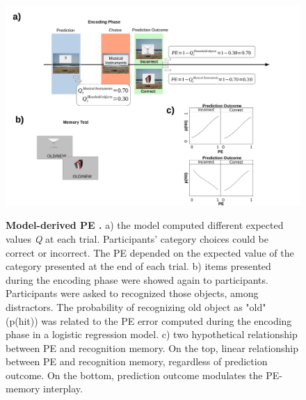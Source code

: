 \documentclass[a4paper,12pt]{article}
\begin{document}
\begin{figure}[ht!]
{\includegraphics[width=1\textwidth]{figures/Computational_model.jpg}}
\caption{\textbf{Model-derived PE .} a) the model computed different expected values \textit{Q} at each trial. Participants' category choices could be correct or incorrect. The PE depended on the expected value of the category presented at the end of each trial. b) items presented during the encoding phase were showed again to participants. Participants were asked to recognized those objects, among distractors. The probability of recognizing old object as "old" (p(hit)) was related to the PE error computed during the encoding phase in a logistic regression model. c) two hypothetical relationship between PE and recognition memory. On the top, linear relationship between PE and recognition memory, regardless of prediction outcome. On the bottom, prediction outcome modulates the PE-memory interplay.  }
\label{fig:comp_mod}
\end{figure}
\end{document}
